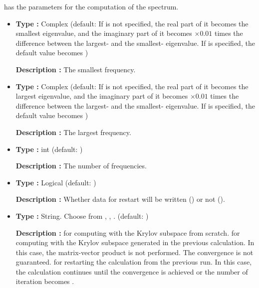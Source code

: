 \documentclass[letterpaper,10pt,dvipdfmx,openany]{sphinxmanual}
\begin{document}
 has the parameters for the computation of the spectrum.
\begin{itemize}
\item {} 

\textbf{Type :} Complex (default: If  is not specified,
the real part of it becomes the smallest eigenvalue,
and the imaginary part of it becomes \(\times0.01\) times
the difference between the largest- and the smallest- eigenvalue.
If  is specified, the default value becomes )

\textbf{Description :} The smallest frequency.

\item {} 

\textbf{Type :} Complex (default: If  is not specified,
the real part of it becomes the largest eigenvalue,
and the imaginary part of it becomes \(\times0.01\) times
the difference between the largest- and the smallest- eigenvalue.
If  is specified, the default value becomes )

\textbf{Description :} The largest frequency.

\item {} 

\textbf{Type :} int (default: )

\textbf{Description :} The number of frequencies.

\item {} 

\textbf{Type :} Logical (default: )

\textbf{Description :}
Whether data for restart will be written () or not ().

\item {} 

\textbf{Type :}
String.  Choose from , , .
(default: )

\textbf{Description :}
 for computing with the Krylov subspace from scratch.
 for computing with the Krylov subspace
generated in the previous calculation.
In this case, the matrix-vector product is not performed.
The convergence is not guaranteed.
 for restarting the calculation from the
previous run.
In this case, the calculation continues until
the convergence is achieved or the number of iteration becomes .

\end{itemize}
\end{document}
